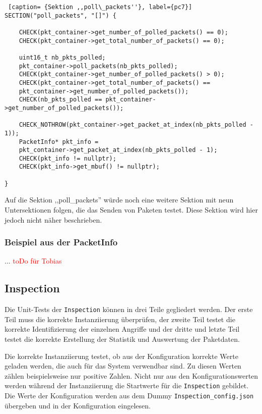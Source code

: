 \documentclass[../review_3.tex]{subfiles}
\begin{document}
\begin{lstlisting} [caption= {Sektion ,,poll\_packets''}, label={pc7}]
SECTION("poll_packets", "[]") {
    
    CHECK(pkt_container->get_number_of_polled_packets() == 0);
    CHECK(pkt_container->get_total_number_of_packets() == 0);
    
    uint16_t nb_pkts_polled;
    pkt_container->poll_packets(nb_pkts_polled);
    CHECK(pkt_container->get_number_of_polled_packets() > 0);
    CHECK(pkt_container->get_total_number_of_packets() ==
    pkt_container->get_number_of_polled_packets());
    CHECK(nb_pkts_polled == pkt_container->get_number_of_polled_packets());
    
    CHECK_NOTHROW(pkt_container->get_packet_at_index(nb_pkts_polled - 1));
    PacketInfo* pkt_info =
    pkt_container->get_packet_at_index(nb_pkts_polled - 1);
    CHECK(pkt_info != nullptr);
    CHECK(pkt_info->get_mbuf() != nullptr);

}\end{lstlisting}

Auf die Sektion ,,poll\_packets'' würde noch eine weitere Sektion mit neun Untersektionen folgen, die das Senden von Paketen testet. Diese Sektion wird hier jedoch nicht näher beschrieben.

\subsubsection{Beispiel aus der PacketInfo}
... %
\textcolor{red}{toDo für Tobias}

\subsection{Inspection}
Die Unit-Tests der \texttt{Inspection} können in drei Teile gegliedert werden.
Der erste Teil muss die korrekte Instanziierung überprüfen, der zweite Teil testet die korrekte Identifizierung der einzelnen Angriffe und der dritte und letzte Teil testet die korrekte Erstellung der Statistik und Auswertung der Paketdaten.

Die korrekte Instanziierung testet, ob aus der Konfiguration korrekte Werte geladen werden, die auch für das System verwendbar sind. Zu diesen Werten zählen beispielsweise nur positive Zahlen. Nicht nur aus den Konfigurationswerten werden während der Instanziierung die Startwerte für die \texttt{Inspection} gebildet. Die Werte der Konfiguration werden aus dem Dummy \texttt{Inspection\_config.json} übergeben und in der Konfiguration eingelesen.
\end{document}
